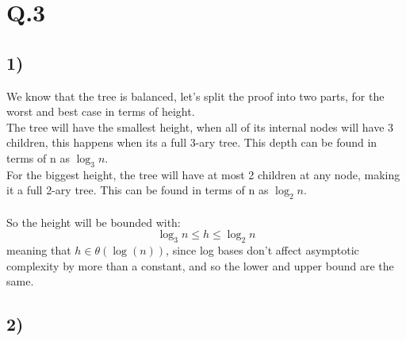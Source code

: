 \documentclass{report}
\begin{document}
\section{Q.3}
\subsection*{1)}
We know that the tree is balanced, let's split the proof into two parts, for the worst and best case in terms of height.\\
The tree will have the smallest height, when all of its internal nodes will have 3 children, this happens when its a full 3-ary tree. This depth can be found in terms of n as $\log_{3}n$.\\
For the biggest height, the tree will have at most 2 children at any node, making it a full 2-ary tree. This can be found in terms of n as $\log_{2}n$.\\\\
So the height will be bounded with:
\begin{equation*}
    \log_{3}n \leq h \leq \log_{2}n
\end{equation*}
meaning that $h \in \theta(\log(n))$, since log bases don't affect asymptotic complexity by more than a constant, and so the lower and upper bound are the same.\\

\subsection*{2)}
\end{document}
